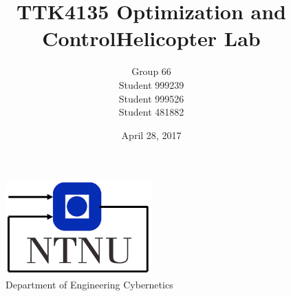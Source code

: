 


\title{TTK4135 Optimization and Control\linebreak Helicopter Lab}
\author{Group 66\\Student 999239\\Student 999526\\Student 481882}
\date{April 28, 2017}
\begin{titlepage}
    \maketitle
    \begin{figure}
    \centering
    \includegraphics[width=0.5\textwidth]{figures/itk_ntnu}\\
    Department of Engineering Cybernetics
    \end{figure}
    \thispagestyle{empty}
\end{titlepage}

\newpage
{}


\newpage
\tableofcontents

\newpage
{}









\newpage
{}
\printbibliography{}
\label{sec:bibliography}


